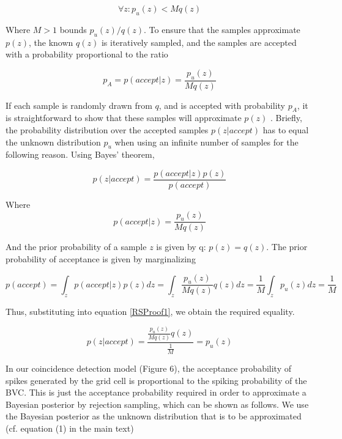 \begin{equation}\label{RejSamp}
\forall z : p_u(z) < Mq(z)
\end{equation}

Where $M>1$ bounds $p_u(z)/q(z)$. To ensure that the samples approximate $p(z)$, the known $q(z)$ is iteratively sampled, and the samples are accepted with a probability proportional to the ratio 

\begin{equation}\label{AccProb}
p_A=p(accept|z)=\frac{p_u(z)}{Mq(z)}
\end{equation}

If each sample is randomly drawn from $q$, and is accepted with probability $p_A$, it is straightforward to show that these samples will approximate $p(z)$ \cite{Liu1996, Bishop2006}. Briefly, the probability distribution over the accepted samples $ p(z|accept) $ has to equal the unknown distribution $p_u$ when using an infinite number of samples for the following reason. Using Bayes' theorem,

\begin{equation}\label{RSProof1}
p(z|accept)=\frac{p(accept|z) p(z)}{p(accept)} 
\end{equation}

Where
\begin{equation}\label{RSProof2}
p(accept|z)=\frac{p_u(z)}{Mq(z)}
\end{equation}

And the prior probability of a sample $z$ is given by q: $p(z)=q(z)$. The prior probability of acceptance is given by marginalizing

\begin{equation}\label{RSProof3}
p(accept)=\int_z{p(accept|z)p(z)dz}=\int_z{\frac{p_u(z)}{Mq(z)} q(z) dz}=\frac{1}{M}\int_z{p_u(z) dz}=\frac{1}{M}
\end{equation}

Thus, substituting into equation \eqref{RSProof1}, we obtain the required equality.

\begin{equation}\label{RSProof2}
p(z|accept)=\frac{\frac{p_u(z)}{Mq(z)}q(z)}{\frac{1}{M}}=p_u(z)
\end{equation}

In our coincidence detection model (Figure 6), the acceptance probability of spikes generated by the grid cell is proportional to the spiking probability of the BVC. This is just the acceptance probability required in order to approximate a Bayesian posterior by rejection sampling, which can be shown as follows. We use the Bayesian posterior as the unknown distribution that is to be approximated (cf. equation (1) in the main text)

